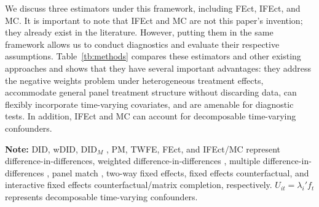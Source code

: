 \documentclass[12pt]{article}
\begin{document}
We discuss three estimators under this framework, including FEct, IFEct, and MC. It is important to note that IFEct and MC are not this paper's invention; they already exist in the literature. However, putting them in the same framework allows us to conduct diagnostics and evaluate their respective assumptions. Table~\ref{tb:methods} compares these estimators and other existing approaches and shows that they have several important advantages: they address the negative weights problem under heterogeneous treatment effects, accommodate general panel treatment structure without discarding data, can flexibly incorporate time-varying covariates, and are amenable for diagnostic tests. In addition, IFEct and MC can account for decomposable time-varying confounders. 

\begin{table}[htbp]
  \caption{Comparison of Methods}\footnotesize\label{tb:methods}
  \medskip

   {\footnotesize\textbf{Note:} DID, wDID, DID$_{M}$ , PM, TWFE, FEct, and IFEct/MC represent difference-in-differences, weighted difference-in-differences \citep{strezhnev2018,sun2020estimating,callaway2020difference}, multiple difference-in-differences \citep{de_Chaisemartin2018-iw}, panel match \citep{imai2018matching}, two-way fixed effects, fixed effects counterfactual, and interactive fixed effects counterfactual/matrix completion, respectively. $U_{it} = \lambda_{i}'f_{t}$ represents decomposable time-varying confounders.}
\end{table}
\end{document}
